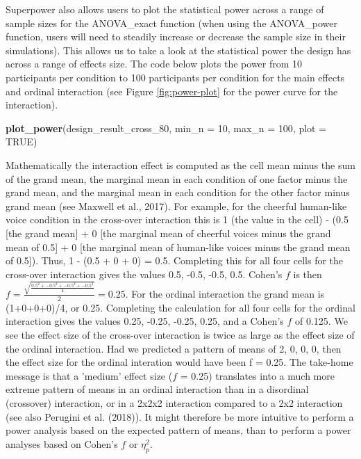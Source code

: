 \documentclass[
  ,jou,floatsintext]{apa6}
\newenvironment{Shaded}{\begin{snugshade}}{\end{snugshade}}
\newcommand{\DataTypeTok}[1]{\textcolor[rgb]{0.13,0.29,0.53}{#1}}
\newcommand{\DecValTok}[1]{\textcolor[rgb]{0.00,0.00,0.81}{#1}}
\newcommand{\KeywordTok}[1]{\textcolor[rgb]{0.13,0.29,0.53}{\textbf{#1}}}
\newcommand{\NormalTok}[1]{#1}
\newcommand{\OtherTok}[1]{\textcolor[rgb]{0.56,0.35,0.01}{#1}}
\begin{document}
Superpower also allows users to plot the statistical power across a range of sample sizes for the ANOVA\_exact function (when using the ANOVA\_power function, users will need to steadily increase or decrease the sample size in their simulations).
This allows us to take a look at the statistical power the design has across a range of effects size.
The code below plots the power from 10 participants per condition to 100 participants per condition for the main effects and ordinal interaction (see Figure \ref{fig:power-plot} for the power curve for the interaction).

\begin{Shaded}
\begin{Highlighting}[]
\KeywordTok{plot_power}\NormalTok{(design_result_cross_}\DecValTok{80}\NormalTok{, }
    \DataTypeTok{min_n =} \DecValTok{10}\NormalTok{, }\DataTypeTok{max_n =} \DecValTok{100}\NormalTok{, }\DataTypeTok{plot =} \OtherTok{TRUE}\NormalTok{)}
\end{Highlighting}
\end{Shaded}

\begin{tcolorbox}[colback=black!5!white,colframe=white!5!black,title=Box 3. Calculating effect sizes for interactions]
Mathematically the interaction effect is computed as the cell mean minus the sum of the grand mean, the marginal mean in each condition of one factor minus the grand mean, and the marginal mean in each condition for the other factor minus grand mean (see Maxwell et al., 2017). For example, for the cheerful human-like voice condition in the cross-over interaction this is 1 (the value in the cell) - (0.5 [the grand mean] + 0 [the marginal mean of cheerful voices minus the grand mean of 0.5] + 0 [the marginal mean of human-like voices minus the grand mean of 0.5]). 
Thus, 1 - (0.5 + 0 + 0) = 0.5.
Completing this for all four cells for the cross-over interaction gives the values 0.5, -0.5, -0.5, 0.5.
Cohen's $f$ is then $f = \frac { \sqrt { \frac { 0.5^2 +-0.5^2 + -0.5^2 + -0.5^2 } { 4 } }}{ 2 } = 0.25$.
For the ordinal interaction the grand mean is (1+0+0+0)/4, or 0.25.
Completing the calculation for all four cells for the ordinal interaction gives the values 0.25, -0.25, -0.25, 0.25, and a Cohen's $f$ of 0.125. 
We see the effect size of the cross-over interaction is twice as large as the effect size of the ordinal interaction. 
Had we predicted a pattern of means of 2, 0, 0, 0, then the effect size for the ordinal interation would have been f = 0.25. 
The take-home message is that a 'medium' effect size ($f$ = 0.25) translates into a much more extreme pattern of means in an ordinal interaction than in a disordinal (crossover) interaction, or in a 2x2x2 interaction compared to a 2x2 interaction (see also Perugini et al. (2018)).
It might therefore be more intuitive to perform a power analysis based on the expected pattern of means, than to perform a power analyses based on Cohen's $f$ or $\eta_p^2$.
\end{tcolorbox}
\end{document}

